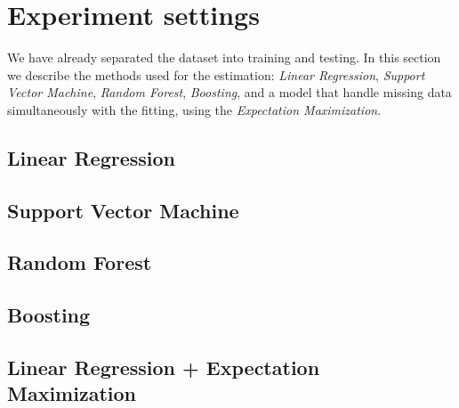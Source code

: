 \section{Experiment settings}
\label{sec:experiments}

We have already separated the dataset into training and testing. In this
section we describe the methods used for the estimation: {\em Linear
Regression}, {\em Support Vector Machine}, {\em Random Forest}, {\em
Boosting}, and a model that handle missing data simultaneously with the
fitting, using the {\em Expectation Maximization}.

\subsection{Linear Regression}

\subsection{Support Vector Machine}

\subsection{Random Forest}

\subsection{Boosting}

\subsection{Linear Regression + Expectation Maximization}